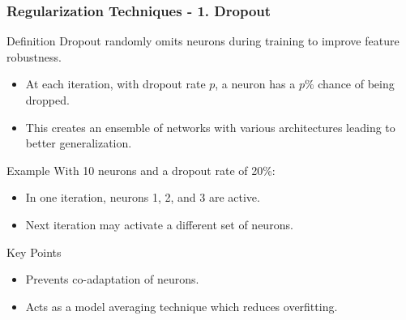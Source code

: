 \documentclass[aspectratio=169]{beamer}
\begin{document}
\begin{frame}[fragile]
    \frametitle{Regularization Techniques - 1. Dropout}
    \begin{block}{Definition}
        Dropout randomly omits neurons during training to improve feature robustness.
    \end{block}
    \begin{itemize}
        \item At each iteration, with dropout rate \( p \), a neuron has a \( p\% \) chance of being dropped.
        \item This creates an ensemble of networks with various architectures leading to better generalization.
    \end{itemize}
    \begin{block}{Example}
        With 10 neurons and a dropout rate of 20\%:
        \begin{itemize}
            \item In one iteration, neurons 1, 2, and 3 are active.
            \item Next iteration may activate a different set of neurons.
        \end{itemize}
    \end{block}
    \begin{block}{Key Points}
        \begin{itemize}
            \item Prevents co-adaptation of neurons.
            \item Acts as a model averaging technique which reduces overfitting.
        \end{itemize}
    \end{block}
\end{frame}
\end{document}
